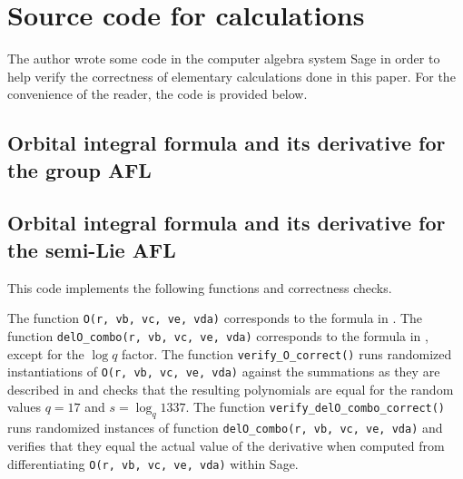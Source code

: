 \chapter{Source code for calculations}
The author wrote some code in the computer algebra system Sage
in order to help verify the correctness of elementary calculations done in this paper.
For the convenience of the reader, the code is provided below.


\section{Orbital integral formula and its derivative for the group AFL}

\section{Orbital integral formula and its derivative for the semi-Lie AFL}
This code implements the following functions and correctness checks.
\begin{itemize}
  \ii The function \texttt{O(r, vb, vc, ve, vda)}
  corresponds to the formula in .
  \ii The function \texttt{delO\_combo(r, vb, vc, ve, vda)}
  corresponds to the formula in ,
  except for the $\log q$ factor.
  \ii The function \texttt{verify\_O\_correct()}
  runs randomized instantiations of \texttt{O(r, vb, vc, ve, vda)}
  against the summations as they are described in 
  and checks that the resulting polynomials are equal for the random values
  $q = 17$ and $s = \log_q 1337$.
  \ii The function \texttt{verify\_delO\_combo\_correct()}
  runs randomized instances of
  function \texttt{delO\_combo(r, vb, vc, ve, vda)}
  and verifies that they equal the actual value of the derivative
  when computed from differentiating \texttt{O(r, vb, vc, ve, vda)} within Sage.
\end{itemize}

\singlespacing

\onehalfspacing
